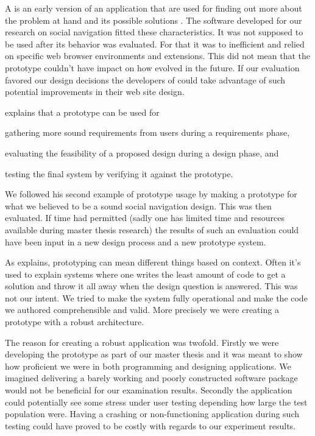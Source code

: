 A  is an early version of an application that are used for
finding out more about the problem at hand and its possible solutions
\citep[]{sommerville06}.
The software developed for our research on social navigation fitted these
characteristics. It was not supposed to be used after its behavior was
evaluated. For that it was to inefficient and relied on specific web browser
environments and extensions. This did not mean that the prototype couldn't
have impact on how \urort{} evolved in the future. If our evaluation favored
our design decisions the developers of \urort{} could take advantage of such
potential improvements in their web site design.

\citet[]{sommerville06} explains that a prototype can be used for
\begin{inparaenum}[(i)]
  \item gathering more sound requirements from users during a
    requirements phase,
  \item evaluating the feasibility of a proposed design during a
    design phase, and
  \item testing the final system by verifying it against the prototype.
\end{inparaenum}
We followed his second example of prototype usage by making a prototype
for what we believed to be a sound social navigation design. This was then
evaluated. If time had permitted (sadly one has limited time and resources
available during master thesis research) the results of such an evaluation
could have been input in a new design process and a new prototype system.

As \citet[]{mcconnell04} explains, prototyping can mean different
things based on context. Often it's used to explain systems where one writes
the least amount of code to get a solution and throw it all away when the
design question is answered. This was not our intent. We tried to make the
system fully operational and make the code we authored comprehensible and
valid. More precisely we were creating a  prototype
\cite[]{rudd96} with a robust architecture.

The reason for creating a robust application was twofold. Firstly we were
developing
the prototype as part of our master thesis and it was meant to show how
proficient we were in both programming and designing applications. We
imagined delivering a barely working and poorly constructed software package
would not be beneficial for our examination results.
Secondly the application could potentially see some stress under user testing
depending how large the test population were. Having a crashing or
non-functioning application during such testing could have proved to be costly
with regards to our experiment results.

